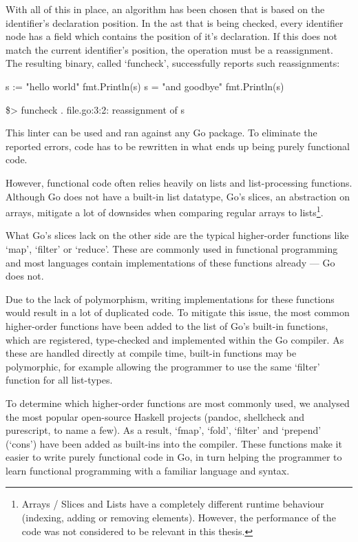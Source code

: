 With all of this in place, an algorithm has been chosen that is based on the identifier's
declaration position. In the \gls{ast} that is being checked, every identifier node has a field
which contains the position of it's declaration. If this does not match the current identifier's
position, the operation must be a reassignment.
The resulting binary, called `funcheck', successfully reports such reassignments:

\begin{gocode}
s := "hello world"
fmt.Println(s)
s = "and goodbye"
fmt.Println(s)
\end{gocode}

\begin{bashcode}
\$> funcheck .
file.go:3:2: reassignment of s
\end{bashcode}

This linter can be used and ran against any Go package. To eliminate the reported errors,
code has to be rewritten in what ends up being purely functional code.

However, functional code often relies heavily on lists and list-processing functions.
Although Go does not have a built-in list datatype, Go's slices, an abstraction on arrays,
mitigate a lot of downsides when comparing regular arrays to lists\footnote{Arrays / Slices
and Lists have a completely different runtime behaviour (indexing, adding or removing elements).
However, the performance of the code was not considered to be relevant in this thesis.}.

What Go's slices lack on the other side are the typical higher-order functions like `map',
`filter' or `reduce'. These are commonly used in functional programming and most languages
contain implementations of these functions already --- Go does not.

Due to the lack of polymorphism, writing implementations for these functions
would result in a lot of duplicated code. To mitigate this issue, the most
common higher-order functions have been added to the list of Go's built-in functions,
which are registered, type-checked and implemented within the Go compiler.
As these are handled directly at compile time, built-in functions may be polymorphic, for
example allowing the programmer to use the same `filter' function for all list-types.

To determine which higher-order functions are most commonly used, we analysed the most
popular open-source Haskell projects (pandoc, shellcheck and purescript, to name a few).
As a result, `fmap', `fold', `filter' and `prepend'
(`cons') have been added as built-ins into the compiler.
These functions make it easier to write purely functional code in Go, in turn helping
the programmer to learn functional programming with a familiar language and syntax.

